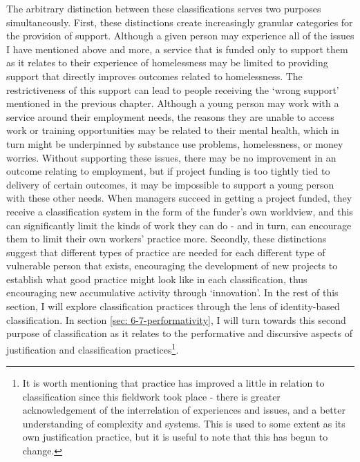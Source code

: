 The arbitrary distinction between these classifications serves two purposes simultaneously. First, these distinctions create increasingly granular categories for the provision of support. Although a given person may experience all of the issues I have mentioned above and more, a service that is funded only to support them as it relates to their experience of homelessness may be limited to providing support that directly improves outcomes related to homelessness. The restrictiveness of this support can lead to people receiving the `wrong support' mentioned in the previous chapter. Although a young person may work with a service around their employment needs, the reasons they are unable to access work or training opportunities may be related to their mental health, which in turn might be underpinned by substance use problems, homelessness, or money worries. Without supporting these issues, there may be no improvement in an outcome relating to employment, but if project funding is too tightly tied to delivery of certain outcomes, it may be impossible to support a young person with these other needs. When managers succeed in getting a project funded, they receive a classification system in the form of the funder's own worldview, and this can significantly limit the kinds of work they can do - and in turn, can encourage them to limit their own workers' practice more.  Secondly, these distinctions suggest that different types of practice are needed for each different type of vulnerable person that exists, encouraging the development of new projects to establish what good practice might look like in each classification, thus encouraging new accumulative activity through `innovation'. In the rest of this section, I will explore classification practices through the lens of identity-based classification. In section \ref{sec: 6-7-performativity}, I will turn towards this second purpose of classification as it relates to the performative and discursive aspects of justification and classification practices\footnote{It is worth mentioning that practice has improved a little in relation to classification since this fieldwork took place - there is greater acknowledgement of the interrelation of experiences and issues, and a better understanding of complexity and systems. This is used to some extent as its own justification practice, but it is useful to note that this has begun to change.}.

